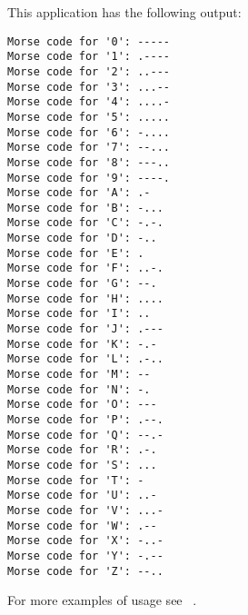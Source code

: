 This application has the following output:

\begin{verbatim}
Morse code for '0': -----
Morse code for '1': .----
Morse code for '2': ..---
Morse code for '3': ...--
Morse code for '4': ....-
Morse code for '5': .....
Morse code for '6': -....
Morse code for '7': --...
Morse code for '8': ---..
Morse code for '9': ----.
Morse code for 'A': .-
Morse code for 'B': -...
Morse code for 'C': -.-.
Morse code for 'D': -..
Morse code for 'E': .
Morse code for 'F': ..-.
Morse code for 'G': --.
Morse code for 'H': ....
Morse code for 'I': ..
Morse code for 'J': .---
Morse code for 'K': -.-
Morse code for 'L': .-..
Morse code for 'M': --
Morse code for 'N': -.
Morse code for 'O': ---
Morse code for 'P': .--.
Morse code for 'Q': --.-
Morse code for 'R': .-.
Morse code for 'S': ...
Morse code for 'T': -
Morse code for 'U': ..-
Morse code for 'V': ...-
Morse code for 'W': .--
Morse code for 'X': -..-
Morse code for 'Y': -.--
Morse code for 'Z': --..
\end{verbatim}

For more examples of usage see ~\cite{mirror-doc-lagoon-examples}.

